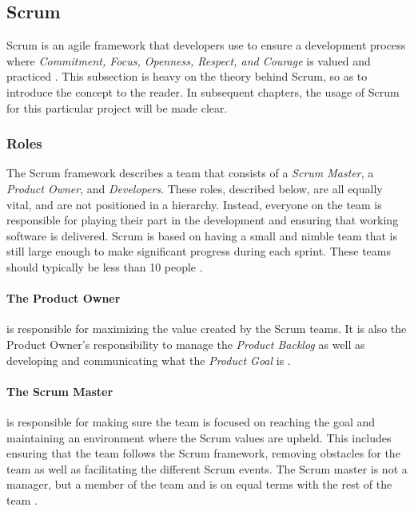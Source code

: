 \subsection{Scrum} \label{sub:scrum}
Scrum is an agile framework that developers use to ensure a development process where \emph{Commitment, Focus, Openness, Respect, and Courage} is valued and practiced \cite{schwaber_sutherland_2022}. 
This subsection is heavy on the theory behind Scrum, so as to introduce the concept to the reader.
In subsequent chapters, the usage of Scrum for this particular project will be made clear.


\subsubsection{Roles}
The Scrum framework describes a team that consists of a \emph{Scrum Master}, a \emph{Product Owner}, and \emph{Developers}. 
These roles, described below, are all equally vital, and are not positioned in a hierarchy. 
Instead, everyone on the team is responsible for playing their part in the development and ensuring that working software is delivered. 
Scrum is based on having a small and nimble team that is still large enough to make significant progress during each sprint.
These teams should typically be less than 10 people \cite{schwaber_sutherland_2022}.

\paragraph{The Product Owner}
is responsible for maximizing the value created by the Scrum teams. 
It is also the Product Owner's responsibility to manage the \emph{Product Backlog} as well as developing and communicating what the \emph{Product Goal} is \cite{schwaber_sutherland_2022}. 

\paragraph{The Scrum Master}
is responsible for making sure the team is focused on reaching the goal and maintaining an environment where the Scrum values are upheld. This includes ensuring that the team follows the Scrum framework, removing obstacles for the team as well as facilitating the different Scrum events.
The Scrum master is not a manager, but a member of the team and is on equal terms with the rest of the team \cite{schwaber_sutherland_2022}.
 
